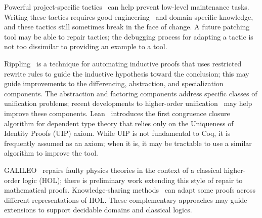 Powerful project-specific tactics~\cite{chlipala:cpdt, Chlipala2013} can help prevent low-level maintenance tasks.
Writing these tactics requires good engineering~\cite{Gonthier2011} and domain-specific knowledge,
and these tactics still sometimes break in the face of change.
A future patching tool may be able to repair tactics; the debugging process
for adapting a tactic is not too dissimilar to providing an example to a tool.

Rippling~\cite{rippling} is a technique for automating inductive proofs that uses restricted rewrite rules to
guide the inductive hypothesis toward the conclusion; this may guide improvements to the
differencing, abstraction, and specialization components.
The abstraction and factoring components address specific classes of unification problems;
recent developments to higher-order unification~\cite{Miller:2012:PHL:2331097} may help
improve these components.
Lean~\cite{selsam:lean} introduces the first congruence closure algorithm for dependent type theory that
relies only on the Uniqueness of Identity Proofs (UIP) axiom. While UIP is not fundamental to Coq,
it is frequently assumed as an axiom; when it is, it may be tractable to use a similar algorithm to improve the tool.

GALILEO~\cite{bundyreasoning} repairs faulty physics theories
in the context of a classical higher-order logic (HOL); there is preliminary work extending this
style of repair to mathematical proofs. 
Knowledge-sharing methods~\cite{tgck-cicm14} can adapt some proofs across different representations of HOL.
These complementary approaches may guide extensions to support decidable domains and classical logics.
\fi


